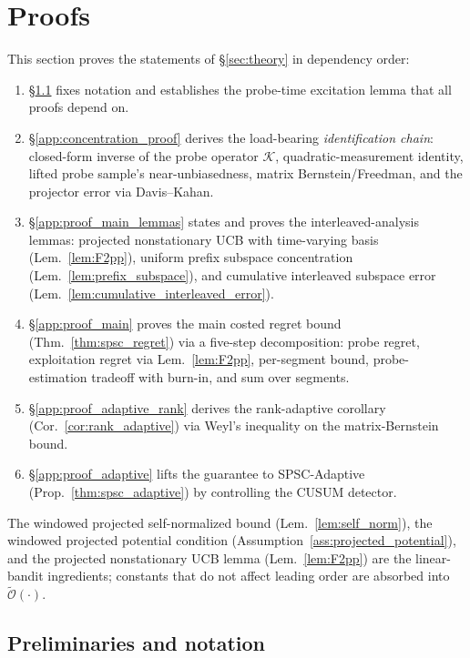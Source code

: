\documentclass{article}
\newcommand{\tilO}{\widetilde{\mathcal{O}}}
\begin{document}
\section{Proofs}
\label{app:proofs}

This section proves the statements of \S\ref{sec:theory} in
dependency order:
\begin{enumerate}[leftmargin=*,itemsep=1pt,topsep=2pt]
  \item \S\ref{app:prelim} fixes notation and establishes the
    probe-time excitation lemma that all proofs depend on.
  \item \S\ref{app:concentration_proof} derives the load-bearing
    \emph{identification chain}: closed-form inverse of the probe
    operator $\mathcal K$, quadratic-measurement identity, lifted
    probe sample's near-unbiasedness, matrix Bernstein/Freedman, and
    the projector error via Davis--Kahan.
  \item \S\ref{app:proof_main_lemmas} states and proves the
    interleaved-analysis lemmas: projected nonstationary UCB with
    time-varying basis (Lem.~\ref{lem:F2pp}), uniform prefix
    subspace concentration (Lem.~\ref{lem:prefix_subspace}), and
    cumulative interleaved subspace error
    (Lem.~\ref{lem:cumulative_interleaved_error}).
  \item \S\ref{app:proof_main} proves the main costed regret bound
    (Thm.~\ref{thm:spsc_regret}) via a five-step decomposition:
    probe regret, exploitation regret via Lem.~\ref{lem:F2pp},
    per-segment bound, probe-estimation tradeoff with burn-in, and
    sum over segments.
  \item \S\ref{app:proof_adaptive_rank} derives the rank-adaptive
    corollary (Cor.~\ref{cor:rank_adaptive}) via Weyl's inequality on
    the matrix-Bernstein bound.
  \item \S\ref{app:proof_adaptive} lifts the guarantee to
    SPSC-Adaptive (Prop.~\ref{thm:spsc_adaptive}) by controlling the
    CUSUM detector.
\end{enumerate}
The windowed projected self-normalized bound
(Lem.~\ref{lem:self_norm}), the windowed projected potential
condition (Assumption~\ref{ass:projected_potential}), and the
projected nonstationary UCB lemma (Lem.~\ref{lem:F2pp}) are the
linear-bandit ingredients; constants that do not affect leading
order are absorbed into $\tilO(\cdot)$.

\subsection{Preliminaries and notation}
\label{app:prelim}
\end{document}
